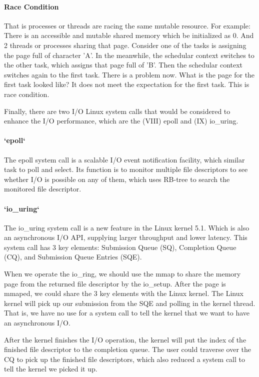 \documentclass[12pt,a4paper]{article}
\begin{document}
\paragraph{Race Condition}
That is processes or threads are racing the same mutable resource. For example:
There is an accessible and mutable shared memory which be initialized as 0. And
2 threads or processes sharing that page. Consider one of the tasks is assigning
the page full of character 'A'. In the meanwhile, the schedular context switches to
the other task, which assigns that page full of 'B'. Then the schedular context switches
again to the first task. There is a problem now. What is the page for the first
task looked like? It does not meet the expectation for the first task.
This is race condition.

Finally, there are two I/O Linux system calls that would be considered to enhance
the I/O performance, which are the (\RN{8}) epoll and (\RN{9}) io\_uring.

\paragraph{`epoll`}
The epoll system call is a scalable I/O event notification facility, which similar
task to poll and select. Its function is to monitor multiple file descriptors to
see whether I/O is possible on any of them, which uses RB-tree to search the monitored
file descriptor.

\paragraph{`io\_uring`}
The io\_uring system call is a new feature in the Linux kernel 5.1. Which is also an
asynchronous I/O API, supplying larger throughput and lower latency. This system call
has 3 key elements: Submission Queue (SQ), Completion Queue (CQ), and Submission Queue
Entries (SQE).

When we operate the io\_ring, we should use the mmap to share the memory page from
the returned file descriptor by the io\_setup. After the page is mmaped, we could share
the 3 key elements with the Linux kernel. The Linux kernel will pick up our submission
from the SQE and polling in the kernel thread. That is, we have no use for a system call
to tell the kernel that we want to have an asynchronous I/O.

After the kernel finishes the I/O operation, the kernel will put the index of the finished
file descriptor to the completion queue. The user could traverse over the CQ to pick up
the finished file descriptors, which also reduced a system call to tell the kernel we picked
it up.
\end{document}
